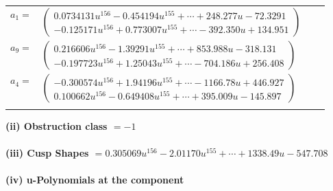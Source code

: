 \documentclass[1p]{elsarticle_modified}
\theoremstyle{definition}
\begin{document}
\begin{tabular}{m{7pt} m{180pt} m{7pt} m{180pt} }
\flushright $a_{1}=$&$\begin{pmatrix}0.0734131 u^{156}-0.454194 u^{155}+\cdots+248.277 u-72.3291\\-0.125171 u^{156}+0.773007 u^{155}+\cdots-392.350 u+134.951\end{pmatrix}$ \\
\flushright $a_{9}=$&$\begin{pmatrix}0.216606 u^{156}-1.39291 u^{155}+\cdots+853.988 u-318.131\\-0.197723 u^{156}+1.25043 u^{155}+\cdots-704.186 u+256.408\end{pmatrix}$ \\
\flushright $a_{4}=$&$\begin{pmatrix}-0.300574 u^{156}+1.94196 u^{155}+\cdots-1166.78 u+446.927\\0.100662 u^{156}-0.649408 u^{155}+\cdots+395.009 u-145.897\end{pmatrix}$\\&\end{tabular}
\flushleft \textbf{(ii) Obstruction class $= -1$}\\~\\
\flushleft \textbf{(iii) Cusp Shapes $= 0.305069 u^{156}-2.01170 u^{155}+\cdots+1338.49 u-547.708$}\\~\\
\newpage\renewcommand{\arraystretch}{1}
\flushleft \textbf{(iv) u-Polynomials at the component}\newline \\
\end{document}
